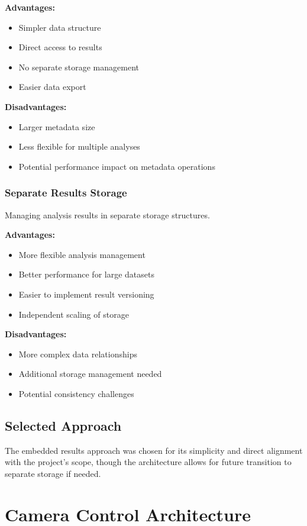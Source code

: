 \textbf{Advantages:}
\begin{itemize}
    \item Simpler data structure
    \item Direct access to results
    \item No separate storage management
    \item Easier data export
\end{itemize}

\textbf{Disadvantages:}
\begin{itemize}
    \item Larger metadata size
    \item Less flexible for multiple analyses
    \item Potential performance impact on metadata operations
\end{itemize}

\subsubsection{Separate Results Storage}
Managing analysis results in separate storage structures.

\textbf{Advantages:}
\begin{itemize}
    \item More flexible analysis management
    \item Better performance for large datasets
    \item Easier to implement result versioning
    \item Independent scaling of storage
\end{itemize}

\textbf{Disadvantages:}
\begin{itemize}
    \item More complex data relationships
    \item Additional storage management needed
    \item Potential consistency challenges
\end{itemize}

\subsection{Selected Approach}
The embedded results approach was chosen for its simplicity and direct alignment with the project's scope, though the architecture allows for future transition to separate storage if needed.

\section{Camera Control Architecture}


